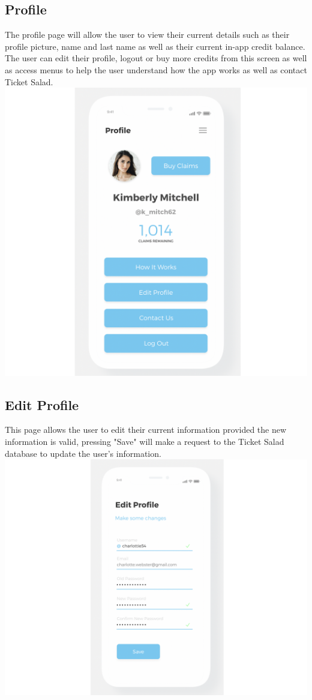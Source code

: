 \documentclass[11pt]{article}
\begin{document}
	\subsection{Profile}
	The profile page will allow the user to view their current details such as their profile picture, name and last name as well as their current in-app credit balance. The user can edit their profile, logout or buy more 		credits from this screen as well as access menus to help the user understand how the app works as well as contact Ticket Salad.
	\\
	\includegraphics[width=\linewidth]{profile.png}
	\pagebreak
	\subsection{Edit Profile}
	This page allows the user to edit their current information provided the new information is valid, pressing 		"Save" will make a request to the Ticket Salad database to update the user's information.
	\\
	\includegraphics[width=\linewidth]{edit.png}
	\pagebreak
\end{document}
